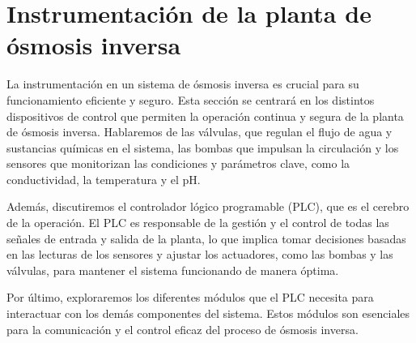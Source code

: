 \section{Instrumentación de la planta de ósmosis inversa}


La instrumentación en un sistema de ósmosis inversa es crucial para su funcionamiento eficiente y seguro.
Esta sección se centrará en los distintos dispositivos de control que permiten la operación continua y
segura de la planta de ósmosis inversa. Hablaremos de las válvulas, que regulan el flujo de agua y sustancias
químicas en el sistema, las bombas que impulsan la circulación y los sensores que monitorizan
las condiciones y parámetros clave, como la conductividad, la temperatura y el pH.

Además, discutiremos el controlador lógico programable (PLC), que es el cerebro de la operación. El PLC es responsable
de la gestión y el control de todas las señales de entrada y salida de la planta, lo que implica tomar decisiones basadas
en las lecturas de los sensores y ajustar los actuadores, como las bombas y las válvulas, para mantener el sistema
funcionando de manera óptima.

Por último, exploraremos los diferentes módulos que el PLC necesita para interactuar con los demás componentes del sistema.
Estos módulos son esenciales para la comunicación y el control eficaz del proceso de ósmosis inversa.




% 

